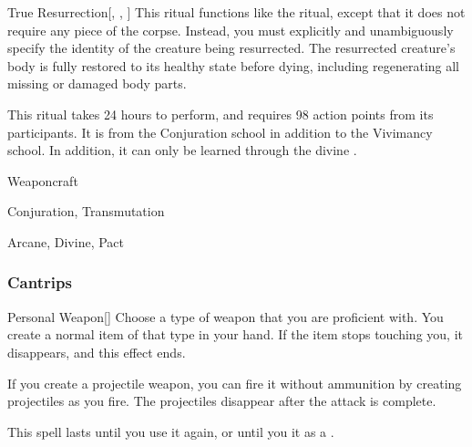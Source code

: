 \lowercase{\hypertarget{spell:True Resurrection}{}}\label{spell:True Resurrection}
\begin{freeability}[\nth{7}]{\hypertarget{spell:True Resurrection}{True Resurrection}}[, , ]
This ritual functions like the  ritual, except that it does not require any piece of the corpse.
Instead, you must explicitly and unambiguously specify the identity of the creature being resurrected.
The resurrected creature's body is fully restored to its healthy state before dying, including regenerating all missing or damaged body parts.

This ritual takes 24 hours to perform, and requires 98 action points from its participants.
It is from the Conjuration school in addition to the Vivimancy school.
In addition, it can only be learned through the divine .
\end{freeability}
\vspace{0.25em}


\newpage
\begin{spellsection}{Weaponcraft}

\begin{spellheader}
\end{spellheader}


 Conjuration, Transmutation

 Arcane, Divine, Pact

\subsubsection{Cantrips}


\begin{apability}{Personal Weapon}[]
Choose a type of weapon that you are proficient with.
You create a normal item of that type in your hand.
If the item stops touching you, it disappears, and this effect ends.

If you create a projectile weapon, you can fire it without ammunition by creating projectiles as you fire.
The projectiles disappear after the attack is complete.

This spell lasts until you use it again, or until you  it as a .
\end{apability}

\end{spellsection}


